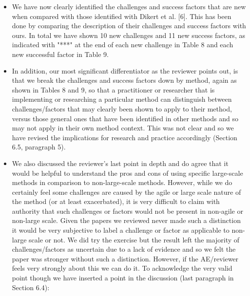 \documentclass[a4paper,twoside,11pt]{reviewresponse}
\begin{document}
\begin{itemize}
	\item We have now clearly identified the challenges and success factors that are new when compared with those identified with Dikert et al. [6]. This has been done by comparing the description of their challenges and success factors with ours. In total we have shown 10 new challenges and 11 new success factors, as indicated with "***" at the end of each new challenge in Table 8 and each new successful factor in Table 9.
	\item In addition, our most significant differentiator as the reviewer points out, is that we break the challenges and success factors down by method, again as shown in Tables 8 and 9, so that a practitioner or researcher that is implementing or researching a particular method can distinguish between challenges/factors that may clearly been shown to apply to their method, versus those general ones that have been identified in other methods and so may not apply in their own method context. This was not clear and so we have revised the implications for research and practice accordingly (Section 6.5, paragraph 5). %
	\item We also discussed the reviewer's last point in depth and do agree that it would be helpful to understand the pros and cons of using specific large-scale methods in comparison to non-large-scale methods. However, while we do certainly feel some challenges are caused by the agile or large scale nature of the method (or at least exacerbated), it is very difficult to claim with authority that such challenges or factors would not be present in non-agile or non-large scale. Given the papers we reviewed never made such a distinction it would be very subjective to label a challenge or factor as applicable to non-large scale or not. We did try the exercise but the result left the majority of challenges/factors as uncertain due to a lack of evidence and so we felt the paper was stronger without such a distinction. However, if the AE/reviewer feels very strongly about this we can do it. To acknowledge the very valid point though we have inserted a point in the discussion (last paragraph in Section 6.4):\\


\end{itemize}
\end{document}
